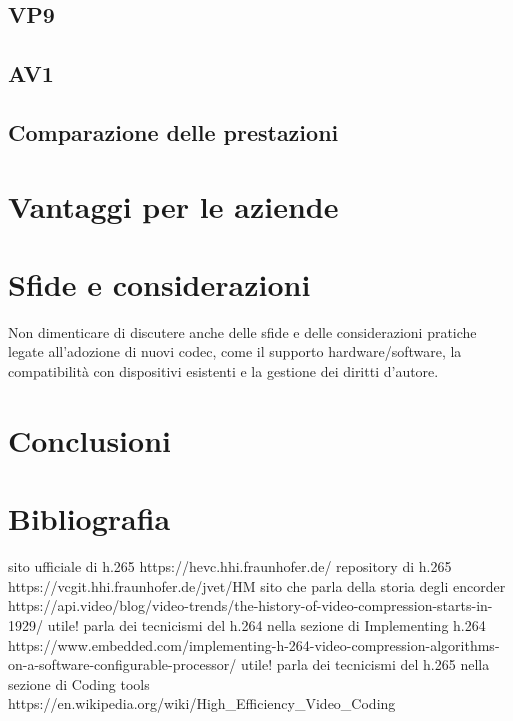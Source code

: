 \documentclass[a4paper,12pt, oneside]{article}
\begin{document}
\subsection{VP9}    %
\subsection{AV1}
\subsection{Comparazione delle prestazioni}

\section{Vantaggi per le aziende}

\section{Sfide e considerazioni}
Non dimenticare di discutere anche delle sfide e delle considerazioni pratiche legate all'adozione di nuovi codec, come il supporto hardware/software, la compatibilità con dispositivi esistenti e la gestione dei diritti d'autore.

\section{Conclusioni}

\section{Bibliografia}
sito ufficiale di h.265 https://hevc.hhi.fraunhofer.de/
repository di h.265 https://vcgit.hhi.fraunhofer.de/jvet/HM
sito che parla della storia degli encorder https://api.video/blog/video-trends/the-history-of-video-compression-starts-in-1929/
utile! parla dei tecnicismi del h.264 nella sezione di Implementing h.264 https://www.embedded.com/implementing-h-264-video-compression-algorithms-on-a-software-configurable-processor/
utile! parla dei tecnicismi del h.265 nella sezione di Coding tools https://en.wikipedia.org/wiki/High_Efficiency_Video_Coding
\end{document}
